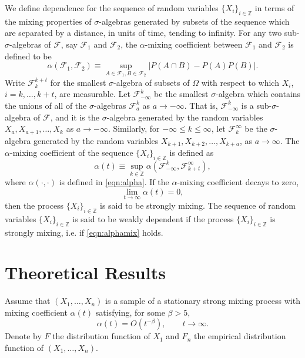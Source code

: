 \documentclass[a4paper, 12pt]{article}
\theoremstyle{plain}
\theoremstyle{definition}
\begin{document}
We define dependence for the sequence of random variables $\{X_{i}\}_{i \in \mathbb{Z}}$ in terms of the mixing properties of $\sigma$-algebras generated by subsets of the sequence which are separated by a distance, in units of time, tending to infinity. For any two sub-$\sigma$-algebras of $\mathcal{F}$, say $\mathcal{F}_{1}$ and $\mathcal{F}_{2}$, the $\alpha$-mixing coefficient between $\mathcal{F}_{1}$ and $\mathcal{F}_{2}$ is defined to be \citep[Section 16.2.1]{AthreyaLahiri:2006}
\begin{equation}
\label{eqn:alpha}
\alpha(\mathcal{F}_{1}, \mathcal{F}_{2}) \equiv \sup_{A \in \mathcal{F}_{1}, B \in \mathcal{F}_{2}} \vert P(A \cap B)-P(A)P(B) \vert .
\end{equation}
Write $\mathcal{F}_{k}^{k+t}$ for the smallest $\sigma$-algebra of subsets of $\Omega$ with respect to which $X_{i}$, $i=k, \ldots, k+t$, are measurable. Let $\mathcal{F}_{-\infty}^{k}$ be the smallest $\sigma$-algebra which contains the unions of all of the $\sigma$-algebras $\mathcal{F}_{a}^{k}$ as $a \rightarrow -\infty$. That is, $\mathcal{F}_{-\infty}^{k}$ is a sub-$\sigma$-algebra of $\mathcal{F}$, and it is the $\sigma$-algebra generated by the random variables $X_{a}, X_{a+1}, \ldots, X_{k}$ as $a\rightarrow -\infty$. Similarly, for $-\infty \leq k  \leq \infty$, let $\mathcal{F}_{k}^{\infty}$ be the $\sigma$-algebra generated by the random variables $X_{k+1}, X_{k+2}, \ldots, X_{k+a}$, as $a \rightarrow \infty$. The $\alpha$-mixing coefficient of the sequence $\{X_{i}\}_{i \in \mathbb{Z}}$ is defined as
\[
\alpha(t) \equiv \sup_{k \in \mathbb{Z}} \alpha(\mathcal{F}_{-\infty}^{k}, \mathcal{F}_{k+t}^{\infty}),
\]
where $\alpha(\cdot, \cdot)$ is defined in \eqref{eqn:alpha}. If the $\alpha$-mixing coefficient decays to zero, 
\begin{equation}
\label{eqn:alphamix}
\lim_{t \rightarrow \infty} \alpha(t) = 0,
\end{equation}
then the process $\{X_{i}\}_{i \in \mathbb{Z}}$ is said to be strongly mixing. The sequence of random variables $\{X_{i}\}_{i \in \mathbb{Z}}$ is said to be weakly dependent if the process $\{X_{i} \}_{i \in \mathbb{Z}}$ is strongly mixing, i.e. if \eqref{eqn:alphamix} holds.

\section{Theoretical Results}
\label{sec:theory}

Assume that $(X_1,\ldots,X_n)$ is a sample of a stationary
strong mixing process with mixing
coefficient $\alpha(t)$ satisfying, for some $\beta>5$,
\[ \alpha(t)=O(t^{-\beta}),\qquad t\rightarrow\infty. \]
Denote by $F$ the distribution function of $X_1$ and
$F_n$ the empirical distribution function of $(X_1,\ldots,X_n)$.
\end{document}
